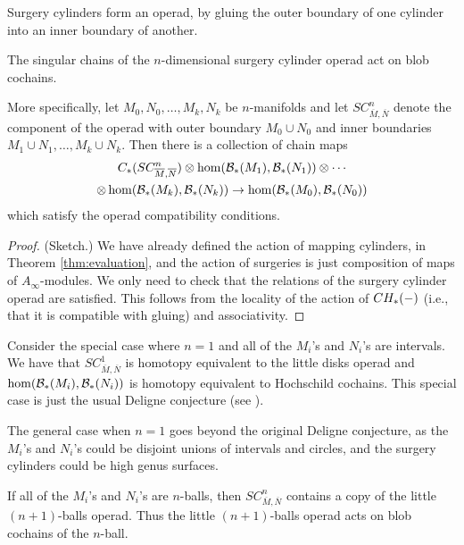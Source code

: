 \documentclass{pnastwo}
\begin{document}
\begin{article}
Surgery cylinders form an operad, by gluing the outer boundary of one cylinder into an inner boundary of another.

\begin{thm}
\label{thm:deligne}
The singular chains of the $n$-dimensional surgery cylinder operad act on blob cochains.
\end{thm}

More specifically, let $M_0, N_0, \ldots, M_k, N_k$ be $n$-manifolds and let $SC^n_{\overline{M}, \overline{N}}$
denote the component of the operad with outer boundary $M_0\cup N_0$ and inner boundaries
$M_1\cup N_1,\ldots, M_k\cup N_k$.
Then there is a collection of chain maps
\begin{multline*}
	C_*(SC^n_{\overline{M}, \overline{N}})\otimes \hom({\mathcal B}_*(M_1), {\mathcal B}_*(N_1))\otimes\cdots \\
		\otimes \hom({\mathcal B}_*(M_{k}), {\mathcal B}_*(N_{k})) \to  \hom({\mathcal B}_*(M_0), {\mathcal B}_*(N_0))
\end{multline*}
which satisfy the operad compatibility conditions.

\begin{proof} (Sketch.)
We have already defined the action of mapping cylinders, in Theorem \ref{thm:evaluation}, 
and the action of surgeries is just composition of maps of $A_\infty$-modules. 
We only need to check that the relations of the surgery cylinder operad are satisfied. 
This follows from the locality of the action of $CH_*(-)$ (i.e., that it is compatible with gluing) and associativity.
\end{proof} 

Consider the special case where $n=1$ and all of the $M_i$'s and $N_i$'s are intervals.
We have that $SC^1_{\overline{M}, \overline{N}}$ is homotopy equivalent to the little
disks operad and $\hom({\mathcal B}_*(M_i), {\mathcal B}_*(N_i))$ is homotopy equivalent to Hochschild cochains.
This special case is just the usual Deligne conjecture
(see \cite{hep-th/9403055, MR1328534, MR1805894, MR1805923, MR2064592}).

The general case when $n=1$ goes beyond the original Deligne conjecture, as the $M_i$'s and $N_i$'s
could be disjoint unions of intervals and circles, and the surgery cylinders could be high genus surfaces.

If all of the $M_i$'s and $N_i$'s are $n$-balls, then $SC^n_{\overline{M}, \overline{N}}$
contains a copy of the little $(n{+}1)$-balls operad.
Thus the little $(n{+}1)$-balls operad acts on blob cochains of the $n$-ball.




\end{article}
\end{document}
